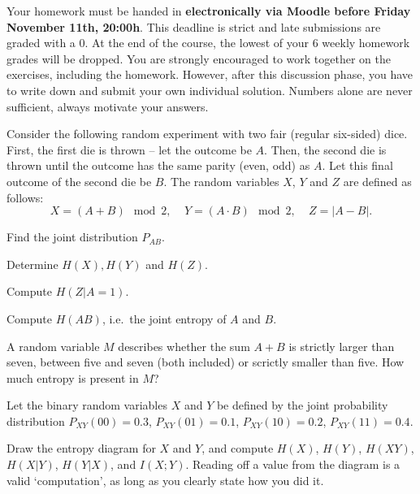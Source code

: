 \documentclass[a4paper,10pt,landscape,twocolumn]{scrartcl}
\newcommand\deadline{Friday November 11th, 20:00h}
\begin{document}
\homeworkproblems

{\sffamily\noindent
Your homework must be handed in \textbf{electronically via Moodle before \deadline}. This deadline is strict and late submissions are graded with a 0. At the end of the course, the lowest of your 6 weekly homework grades will be dropped. You are strongly encouraged to work together on the exercises, including the homework. However, after this discussion phase, you have to write down and submit your own individual solution. Numbers alone are never sufficient, always motivate your answers.
}

\begin{exercise}
Consider the following random experiment with two fair (regular six-sided) dice. First, the first die is thrown -- let the outcome be $A$. Then, the second die is thrown until the outcome has the same parity (even, odd) as $A$. Let this final outcome of the second die be $B$. The random variables $X$, $Y$ and $Z$ are defined as follows:
\[
X = (A + B) \mod 2, \ \ \ \ \ Y = (A \cdot B) \mod 2, \ \ \ \ \ Z = |A - B|.
\]
	\begin{subex}[(1pt)]
	Find the joint distribution $P_{AB}$.
	\end{subex}
	\begin{subex}[(1pt)]
	Determine $H(X), H(Y)$ and $H(Z)$.
	\end{subex}
	\begin{subex}[(1pt)]
	Compute $H(Z|A=1)$.
	\end{subex}
	\begin{subex}[(1pt)]
	Compute $H(AB)$, i.e.\ the joint entropy of $A$ and $B$.
	\end{subex}
	\begin{subex}[(2pt)]
	A random variable $M$ describes whether the sum $A + B$ is strictly larger than seven, between five and seven (both included) or scrictly smaller than five. How much entropy is present in $M$?
	\end{subex}
\end{exercise}

\begin{exercise}
Let the binary random variables $X$ and $Y$ be defined by the joint probability distribution $P_{XY}(00) = 0.3$, $P_{XY}(01) = 0.1$, $P_{XY}(10) = 0.2$, $P_{XY}(11) = 0.4$.

Draw the entropy diagram for $X$ and $Y$, and compute $H(X)$, $H(Y)$, $H(XY)$, $H(X|Y)$, $H(Y|X)$, and $I(X;Y)$. Reading off a value from the diagram is a valid `computation', as long as you clearly state how you did it.
\begin{center}
\end{center}
\end{exercise}
\end{document}
